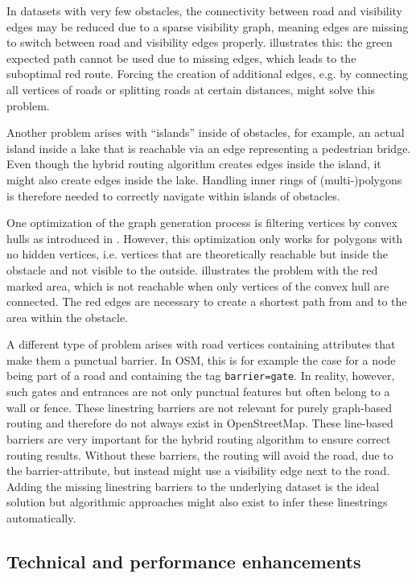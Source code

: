 		In datasets with very few obstacles, the connectivity between road and visibility edges may be reduced due to a sparse visibility graph, meaning edges are missing to switch between road and visibility edges properly.
		 illustrates this:
		the green expected path cannot be used due to missing edges, which leads to the suboptimal red route.
		Forcing the creation of additional edges, e.g. by connecting all vertices of roads or splitting roads at certain distances, might solve this problem.
		
		Another problem arises with \enquote{islands} inside of obstacles, for example, an actual island inside a lake that is reachable via an edge representing a pedestrian bridge.
		Even though the hybrid routing algorithm creates edges inside the island, it might also create edges inside the lake.
		Handling inner rings of (multi-)polygons is therefore needed to correctly navigate within islands of obstacles.
		
		One optimization of the graph generation process is filtering vertices by convex hulls as introduced in .
		However, this optimization only works for polygons with no hidden vertices, i.e. vertices that are theoretically reachable but inside the obstacle and not visible to the outside.
		 illustrates the problem with the red marked area, which is not reachable when only vertices of the convex hull are connected.
		The red edges are necessary to create a shortest path from and to the area within the obstacle.
		
		A different type of problem arises with road vertices containing attributes that make them a punctual barrier.
		In OSM, this is for example the case for a node being part of a road and containing the tag \texttt{barrier=gate}.
		In reality, however, such gates and entrances are not only punctual features but often belong to a wall or fence.
		These linestring barriers are not relevant for purely graph-based routing and therefore do not always exist in OpenStreetMap.
		These line-based barriers are very important for the hybrid routing algorithm to ensure correct routing results.
		Without these barriers, the routing will avoid the road, due to the barrier-attribute, but instead might use a visibility edge next to the road.
		Adding the missing linestring barriers to the underlying dataset is the ideal solution but algorithmic approaches might also exist to infer these linestrings automatically.
		
	\subsection{Technical and performance enhancements}
		
